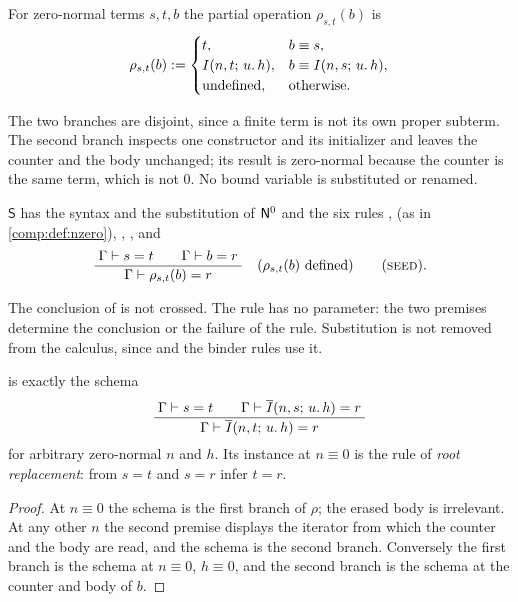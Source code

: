 \begin{definition}
\label{comp:def:rho}
For zero-normal terms $s,t,b$ the partial operation $\rho_{s,t}(b)$ is
\[
 \rho_{s,t}(b)\mathrel{:=}
 \begin{cases}
  t, & b\equiv s,\\
  I(n,t;\,u.\,h), & b\equiv I(n,s;\,u.\,h),\\
  \text{undefined}, & \text{otherwise}.
 \end{cases}
\]
\end{definition}

The two branches are disjoint, since a finite term is not its own proper
subterm. The second branch inspects one constructor and its initializer and
leaves the counter and the body unchanged; its result is zero-normal because
the counter is the same term, which is not $0$. No bound variable is
substituted or renamed.

\begin{definition}
\label{comp:def:seedcalc}
$\mathsf{S}$ has the syntax and the substitution of $\mathsf{N}^{0}$ and the six
rules ,  (as in \cref{comp:def:nzero}),
, ,  and
\[
 \infrule{\Gamma\proves s=t\qquad\Gamma\proves b=r}
         {\Gamma\proves\rho_{s,t}(b)=r}
 \quad(\rho_{s,t}(b)\text{ defined})
 \qquad\text{(\rulename{Seed})}.
\]
\end{definition}

The conclusion of  is not crossed. The rule has no parameter:
the two premises determine the conclusion or the failure of the rule.
Substitution is not removed from the calculus, since  and the
binder rules use it.

\begin{lemma}
\label{comp:lem:seedschema}
 is exactly the schema
\[
 \dfrac{\;\Gamma\vdash s=t\qquad
          \Gamma\vdash\overline{I}(n,s;\,u.\,h)=r\;}{\;\Gamma\vdash\overline{I}(n,t;\,u.\,h)=r\;}
\]
for arbitrary zero-normal $n$ and $h$. Its instance at $n\equiv0$ is the
rule of \emph{root replacement}: from $s=t$ and $s=r$ infer $t=r$.
\end{lemma}

\begin{proof}
At $n\equiv0$ the schema is the first branch of $\rho$; the erased body is
irrelevant. At any other $n$ the second premise displays the iterator from
which the counter and the body are read, and the schema is the second
branch. Conversely the first branch is the schema at $n\equiv0$, $h\equiv0$,
and the second branch is the schema at the counter and body of $b$.
\end{proof}


